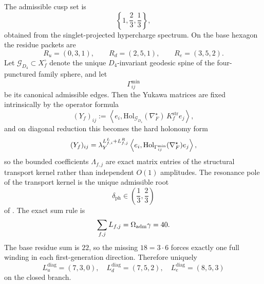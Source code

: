 \begin{theorem}
\label{thm:exact-transport-closure}
\label{thm:canonical-transport-kernel}
The admissible cusp set is
\[
\left\{1,\frac23,\frac13\right\},
\]
obtained from the singlet-projected hypercharge spectrum. On the base hexagon the residue packets
are
\[
R_u=(0,3,1),
\qquad
R_d=(2,5,1),
\qquad
R_e=(3,5,2).
\]
Let $\mathcal G_{D_4}\subset X_f^\circ$ denote the unique $D_4$-invariant geodesic spine of the
four-punctured family sphere, and let
\[
\Gamma_{ij}^{\min}
\]
be its canonical admissible edges. Then the Yukawa matrices are fixed intrinsically by the operator
formula
\[
(Y_f)_{ij}
:=
\left\langle e_i,\mathrm{Hol}_{\mathcal G_{D_4}}(\nabla_F^\star)\,K_f^{\mathrm{str}}e_j\right\rangle,
\]
and on diagonal reduction this becomes the hard holonomy form
\[
(Y_f)_{ij}
=
\lambda_Y^{L^L_{f,i}+L^R_{f,j}}
\left\langle e_i,\mathrm{Hol}_{\Gamma_{ij}^{\min}}(\nabla_F^\star)e_j\right\rangle,
\]
so the bounded coefficients $\Lambda_{f,j}$ are exact matrix entries of the structural transport
kernel rather than independent $O(1)$ amplitudes. The resonance pole of the transport kernel is the
unique admissible root
\[
\delta_{\mathrm{ph}}\in\left(\frac13,\frac23\right)
\]
of . The exact sum rule is
\[
\sum_{f,j}L_{f,j}=\Omega_{\mathrm{adm}}\gamma=40.
\]
The base residue sum is $22$, so the missing $18=3\cdot 6$ forces exactly one full winding in
each first-generation direction. Therefore uniquely
\[
L_u^{\mathrm{diag}}=(7,3,0),\quad
L_d^{\mathrm{diag}}=(7,5,2),\quad
L_e^{\mathrm{diag}}=(8,5,3)
\]
on the closed branch.
\end{theorem}

